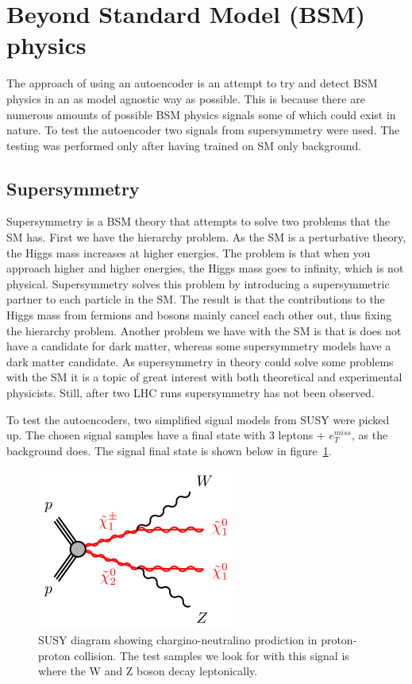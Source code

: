 \section{Beyond Standard Model (BSM) physics}
The approach of using an autoencoder is an attempt to try and detect BSM physics in an as model agnostic way as possible. This is because there are 
numerous amounts of possible BSM physics signals some of which could exist in nature. To test the autoencoder two 
signals from supersymmetry were used. The testing was performed only after having trained on SM only background.
\subsection*{Supersymmetry}
Supersymmetry is a BSM theory that attempts to solve two problems that the SM has. 
First we have the hierarchy problem. As the SM is a perturbative theory, the Higgs mass increases at 
higher energies. The problem is that when you approach higher and higher energies, the Higgs mass goes to infinity, 
which is not physical. Supersymmetry solves this problem by introducing a supersymmetric partner to each particle
in the SM. The result is that the contributions to the Higgs mass from fermions and bosons mainly cancel each other out, 
thus fixing the hierarchy problem. Another problem we have with the SM
is that is does not have a candidate for dark matter, whereas some supersymmetry models have a dark matter candidate.
As supersymmetry in theory could solve some problems with the SM it is a topic of great interest with both theoretical and 
experimental physicists. Still, after two LHC runs supersymmetry has not been observed\cite{atlas_search_2021}. \par 

To test the autoencoders, two simplified signal models from SUSY were picked up. The chosen signal samples have a final state with 3 leptons + $e_T^{miss}$,
as the background does. The signal final state is shown below in figure \ref{fig:sysy_feyn}. 

\begin{figure}[H]
    \centering
    \includegraphics[width=0.4\linewidth]{Figures/susy/C1N2-WZN1N1.png}
    \caption[SUSY feynman diagram]{SUSY diagram showing chargino-neutralino prodiction in proton-proton collision. 
    The test samples we look for with this signal is where the W and Z boson decay leptonically.}
    \label{fig:sysy_feyn}
\end{figure}

